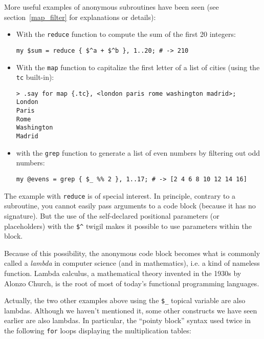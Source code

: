 More useful examples of anonymous subroutines have been 
seen (see section~\ref{map_filter} for explanations or 
details):
\begin{itemize}
\item With the {\tt reduce} function to compute the sum of 
the first 20 integers:
\begin{verbatim}
my $sum = reduce { $^a + $^b }, 1..20; # -> 210
\end{verbatim}
\item With the {\tt map} function to capitalize the first 
letter of a list of cities (using the {\tt tc} built-in):
\begin{verbatim}
> .say for map {.tc}, <london paris rome washington madrid>;
London
Paris
Rome
Washington
Madrid
\end{verbatim}
\item with the {\tt grep} function to generate a list of even 
numbers by filtering out odd numbers:
\begin{verbatim}
my @evens = grep { $_ %% 2 }, 1..17; # -> [2 4 6 8 10 12 14 16]
\end{verbatim}
\end{itemize} 

The example with {\tt reduce} is of special interest. In 
principle, contrary to a subroutine, you cannot easily pass 
arguments to a code block (because it has no signature). 
But the use of the self-declared positional parameters 
(or placeholders) with the \verb'$^' twigil makes it 
possible to use parameters within the block. 

Because of this possibility, the anonymous code block becomes 
what is commonly called a \emph{lambda} in computer science (and 
in mathematics), i.e. a kind of nameless function. Lambda 
calculus, a mathematical theory invented in the 1930s by 
Alonzo Church, is the root of most of today's functional 
programming languages.

Actually, the two other examples above using the \verb'$_' 
topical variable are also lambdas. Although we haven't 
mentioned it, some other constructs we have seen earlier are 
also lambdas. In particular, the ``pointy block'' syntax 
used twice in the following {\tt for} loops displaying 
the multiplication tables:

